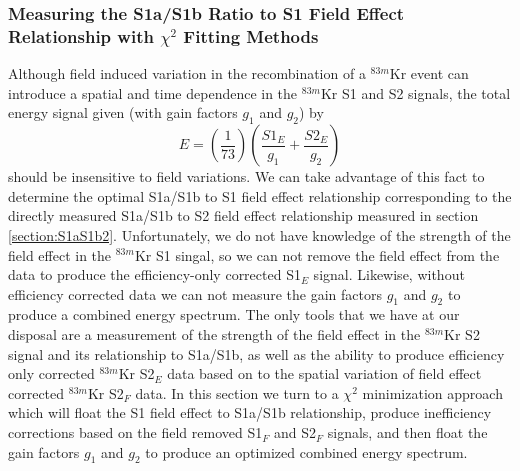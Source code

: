 \documentclass[a4paper,12pt]{article}
\begin{document}
{\subsubsection{Measuring the S1a/S1b Ratio to S1 Field Effect Relationship with $\chi^2$ Fitting Methods} \label{section:S1relation2}

Although field induced variation in the recombination of a $^{83m}$Kr event can introduce a spatial and time dependence in the $^{83m}$Kr S1 and S2 signals, the total energy signal given (with gain factors $g_1$ and $g_2$) by 
\begin{equation} \label{CombinedEnergy}
E=\left(\frac{1}{73}\right)\left(\frac{S1_E}{g_1} + \frac{S2_E}{g_2}\right)
\end{equation}
should be insensitive to field variations.  We can take advantage of this fact to determine the optimal S1a/S1b to S1 field effect relationship corresponding to the directly measured S1a/S1b to S2 field effect relationship measured in section \ref{section:S1aS1b2}.  Unfortunately, we do not have knowledge of the strength of the field effect in the $^{83m}$Kr S1 singal, so we can not remove the field effect from the data to produce the efficiency-only corrected S1$_E$ signal.  Likewise, without efficiency corrected data we can not measure the gain factors $g_1$ and $g_2$ to produce a combined energy spectrum.  The only tools that we have at our disposal are a measurement of the strength of the field effect in the $^{83m}$Kr S2 signal and its relationship to S1a/S1b, as well as the ability to produce efficiency only corrected $^{83m}$Kr S2$_E$ data based on to the spatial variation of field effect corrected  $^{83m}$Kr S2$_F$ data.  In this section we turn to a $\chi^2$ minimization approach which will float the S1 field effect to S1a/S1b relationship, produce inefficiency corrections based on the field removed S1$_F$ and S2$_F$ signals, and then float the gain factors $g_1$ and $g_2$ to produce an optimized combined energy spectrum.  

}
\end{document}

